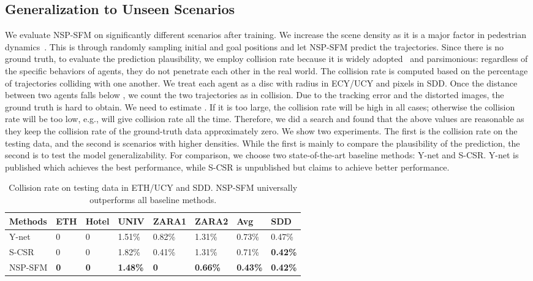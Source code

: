 \documentclass[runningheads]{llncs}
\begin{document}
\subsection{Generalization to Unseen Scenarios}
We evaluate NSP-SFM on significantly different scenarios after training. We increase the scene density as it is a major factor in pedestrian dynamics~\cite{narang2015generating}. This is through randomly sampling initial and goal positions and let NSP-SFM predict the trajectories. Since there is no ground truth, to evaluate the prediction plausibility, we employ collision rate because it is widely adopted~\cite{liu2021social} and parsimonious: regardless of the specific behaviors of agents, they do not penetrate each other in the real world. The collision rate is computed based on the percentage of trajectories colliding with one another. We treat each agent as a disc with radius  in ECY/UCY and  pixels in SDD. Once the distance between two agents falls below , we count the two trajectories as in collision. Due to the tracking error and the distorted images, the ground truth  is hard to obtain. We need to estimate . If it is too large, the collision rate will be high in all cases; otherwise the collision rate will be too low, e.g.,  will give  collision rate all the time. Therefore, we did a search and found that the above values are reasonable as they keep the collision rate of the ground-truth data approximately zero. We show two experiments. The first is the collision rate on the testing data, and the second is scenarios with higher densities. While the first is mainly to compare the plausibility of the prediction, the second is to test the model generalizability. For comparison, we choose two state-of-the-art baseline methods: Y-net and S-CSR. Y-net is published which achieves the best performance, while S-CSR is unpublished but claims to achieve better performance.

\begin{table}[b]
\begin{center}
\caption{Collision rate on testing data in ETH/UCY and SDD. NSP-SFM universally outperforms all baseline methods.}
\begin{tabular}{ |p{1.5cm}||p{1.1cm}|p{1.1cm}|p{1.5cm}|p{1.5cm}|p{1.5cm}|p{1.3cm}| |p{1.3cm}|}
 \hline
  Methods& ETH & Hotel & UNIV & ZARA1 & ZARA2 & Avg & SDD \\
 \hline
 Y-net & 0 & 0 & 1.51\% & 0.82\% & 1.31\% & 0.73\% & 0.47\% \\
 \hline
 S-CSR & 0 & 0  & 1.82\% & 0.41\% & 1.31\% & 0.71\% & \textbf{0.42\%} \\
 \hline
 NSP-SFM & \textbf{0} & \textbf{0} & \textbf{1.48\%} & \textbf{0} & \textbf{0.66\%} & \textbf{0.43\%} & \textbf{0.42\%}\\
 \hline
\end{tabular}
\label{tab:collisionETH}
\end{center}
\end{table}
\end{document}
